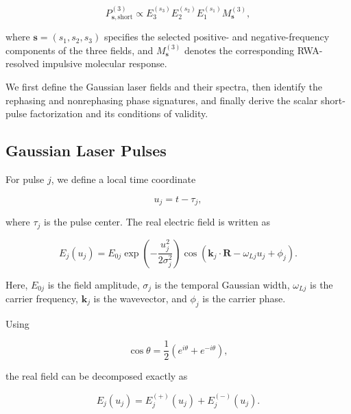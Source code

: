 \documentclass[11pt]{article}
\begin{document}
\begin{equation}
\boxed{
P_{\mathbf{s},\mathrm{short}}^{(3)}
\propto
E_3^{(s_3)}
E_2^{(s_2)}
E_1^{(s_1)}
M_{\mathbf{s}}^{(3)},
}
\end{equation}

where $\mathbf{s}=(s_1,s_2,s_3)$ specifies the selected
positive- and negative-frequency components of the three fields, and
$M_{\mathbf{s}}^{(3)}$ denotes the corresponding RWA-resolved
impulsive molecular response.

We first define the Gaussian laser fields and their spectra, then
identify the rephasing and nonrephasing phase signatures, and finally
derive the scalar short-pulse factorization and its conditions of
validity.


\subsection{Gaussian Laser Pulses}

For pulse $j$, we define a local time coordinate

\begin{equation}
u_j=t-\tau_j,
\end{equation}

where $\tau_j$ is the pulse center. The real electric field is written
as

\begin{equation}
\boxed{
E_j(u_j)
=
E_{0j}
\exp\left(
-\frac{u_j^2}{2\sigma_j^2}
\right)
\cos
\left(
\mathbf{k}_j\cdot\mathbf{R}
-
\omega_{Lj}u_j
+
\phi_j
\right).
}
\label{eq:gaussian_real_pulse}
\end{equation}

Here, $E_{0j}$ is the field amplitude, $\sigma_j$ is the temporal
Gaussian width, $\omega_{Lj}$ is the carrier frequency,
$\mathbf{k}_j$ is the wavevector, and $\phi_j$ is the carrier phase.

Using

\begin{equation}
\cos\theta
=
\frac{1}{2}
\left(
e^{i\theta}
+
e^{-i\theta}
\right),
\end{equation}

the real field can be decomposed exactly as

\begin{equation}
\boxed{
E_j(u_j)
=
E_j^{(+)}(u_j)
+
E_j^{(-)}(u_j).
}
\label{eq:field_decomposition}
\end{equation}
\end{document}
